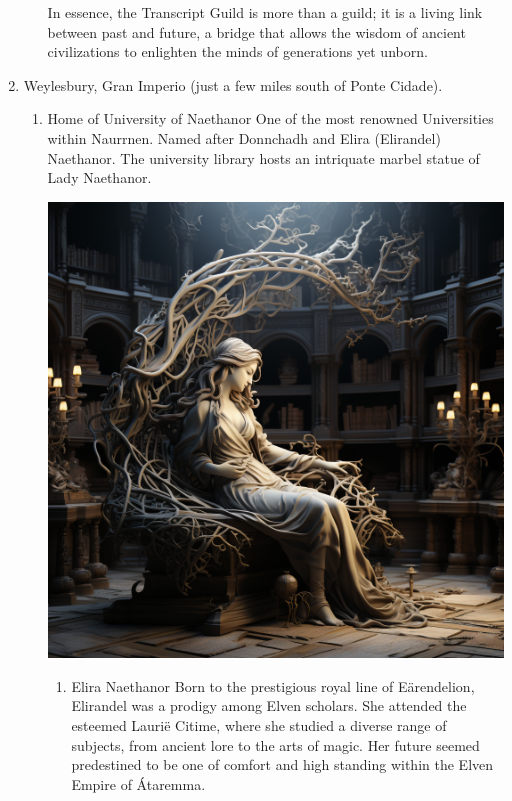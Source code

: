 \documentclass[11pt]{article}
\begin{document}
\begin{enumerate}
\begin{enumerate}
In essence, the Transcript Guild is more than a guild; it is a living link between past and future, a bridge that allows the wisdom of ancient civilizations to enlighten the minds of generations yet unborn.
\end{enumerate}
\item Weylesbury, Gran Imperio (just a few miles south of Ponte Cidade).
\label{sec:org457bb40}
\begin{enumerate}
\item Home of University of Naethanor
\label{sec:org71ef657}
One of the most renowned Universities within Naurrnen. Named after Donnchadh and Elira (Elirandel) Naethanor. The university library hosts an intriquate marbel statue of Lady Naethanor.
\begin{center}
\includegraphics[width=500px]{./img/Elirandel.png}
\end{center}
\begin{enumerate}
\item Elira Naethanor
\label{sec:orge01bbbc}
Born to the prestigious royal line of Eärendelion, Elirandel was a prodigy among Elven scholars. She attended the esteemed Laurië Citime, where she studied a diverse range of subjects, from ancient lore to the arts of magic. Her future seemed predestined to be one of comfort and high standing within the Elven Empire of Átaremma.


\end{enumerate}
\end{enumerate}
\end{enumerate}
\end{document}
